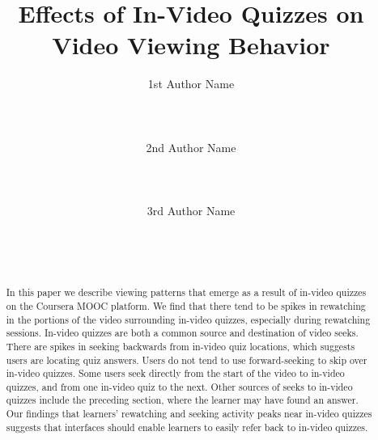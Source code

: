 \documentclass{sigchi}
\begin{document}
\title{Effects of In-Video Quizzes on Video Viewing Behavior}

\author{
  \alignauthor 1st Author Name\\
    \\
    \\
    \\
  \alignauthor 2nd Author Name\\
    \\
    \\
    \\
  \alignauthor 3rd Author Name\\
    \\
    \\
    \\
}

\maketitle

\begin{abstract}
In this paper we describe viewing patterns that emerge as a result of in-video quizzes on the Coursera MOOC platform. We find that there tend to be spikes in rewatching in the portions of the video surrounding in-video quizzes, especially during rewatching sessions. In-video quizzes are both a common source and destination of video seeks. There are spikes in seeking backwards from in-video quiz locations, which suggests users are locating quiz answers. Users do not tend to use forward-seeking to skip over in-video quizzes. Some users seek directly from the start of the video to in-video quizzes, and from one in-video quiz to the next. Other sources of seeks to in-video quizzes include the preceding section, where the learner may have found an answer. Our findings that learners' rewatching and seeking activity peaks near in-video quizzes suggests that interfaces should enable learners to easily refer back to in-video quizzes.
\end{abstract}

\end{document}
